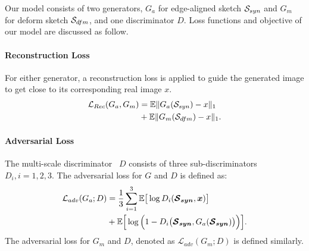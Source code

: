 
Our model consists of two generators, $G_a$ for edge-aligned sketch $\mathcal{S}_{syn}$ and $G_m$ for deform sketch $\mathcal{S}_{dfm}$, and one discriminator $D$. Loss functions and objective of our model are discussed as follow.

\paragraph{Reconstruction Loss}
For either generator, a reconstruction loss is applied to guide the generated image to get close to its corresponding real image $x$.
%
%
\begin{equation}
\label{eqn:loss_rec}
\begin{aligned}
\mathcal{L}_{Rec}(G_a, G_m) &=\mathbb{E}\|G_a(\mathcal{S}_{syn}) - x\|_1 \\
&+ \mathbb{E}\|G_m(\mathcal{S}_{dfm}) - x\|_1.
\end{aligned}
\end{equation}

\paragraph{Adversarial Loss}
The multi-scale discriminator~\cite{pix2pixHD} $D$ consists of three sub-discriminators $D_i, i=1,2,3$.  The adversarial loss for $G$ and $D$ is defined as:
%
%
\begin{equation}
\label{eqn:new_loss_adv}
\begin{aligned}
\mathcal{L}_{adv}(G_a;D) &=\frac{1}{3}\sum_{i=1}^{3}\mathbb{E}\big[\log D_i(\bm{\mathcal{S}_{syn}},\bm{x})\big] \\
& + \mathbb{E}\Big[\log \Big(1-D_i \big(\bm{\mathcal{S}_{syn}},G_a(\bm{\mathcal{S}_{syn}})\big)\Big)\Big].
\end{aligned}
\end{equation}
%
The adversarial loss for $G_m$ and $D$, denoted as $\mathcal{L}_{adv}(G_m;D)$ is defined similarly.

